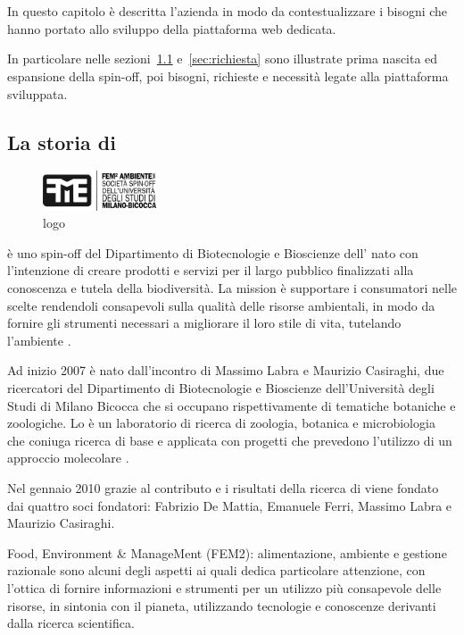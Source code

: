 \chapter{\fem}
\label{chp:fem}
In questo capitolo è descritta l'azienda \textbf{\femsrl} in modo da contestualizzare i bisogni che hanno portato allo sviluppo della piattaforma web dedicata.

In particolare nelle sezioni~\ref{sec:storia-fem} e~\ref{sec:richiesta} sono illustrate prima nascita ed espansione della spin-off, poi bisogni, richieste e necessità legate alla piattaforma sviluppata.

\section{La storia di \fem}
\label{sec:storia-fem}

\begin{figure}
  \centering
  \includegraphics[width=0.3\textwidth]{images/logo-fem}
  \caption{logo}
  \label{fig:logo-fem}
\end{figure}

\textbf{\femsrl} è uno spin-off del Dipartimento di Biotecnologie e Bioscienze dell'{\unimib} nato con l'intenzione di creare prodotti e servizi per il largo pubblico finalizzati alla conoscenza e tutela della biodiversità. La mission è supportare i consumatori nelle scelte rendendoli consapevoli sulla qualità delle risorse ambientali, in modo da fornire gli strumenti necessari a migliorare il loro stile di vita, tutelando l'ambiente \cite{fem2ambiente}.

Ad inizio 2007 è nato \textbf{\zpl} dall'incontro di Massimo Labra e Maurizio Casiraghi, due ricercatori del Dipartimento di Biotecnologie e Bioscienze dell'Università degli Studi di Milano Bicocca che si occupano rispettivamente di tematiche botaniche e zoologiche. Lo {\zpl} è un laboratorio di ricerca di zoologia, botanica e microbiologia che coniuga ricerca di base e applicata con progetti che prevedono l'utilizzo di un approccio molecolare \cite{zooplantlab}.

Nel gennaio 2010 grazie al contributo e i risultati della ricerca di {\zpl} viene fondato {\femsrl} dai quattro soci fondatori: Fabrizio De Mattia, Emanuele Ferri, Massimo Labra e Maurizio Casiraghi.

Food, Environment \& ManageMent (FEM2): alimentazione, ambiente e gestione razionale sono alcuni degli aspetti ai quali {\fem} dedica particolare attenzione, con l'ottica di fornire informazioni e strumenti per un utilizzo più consapevole delle risorse, in sintonia con il pianeta, utilizzando tecnologie e conoscenze derivanti dalla ricerca scientifica.


